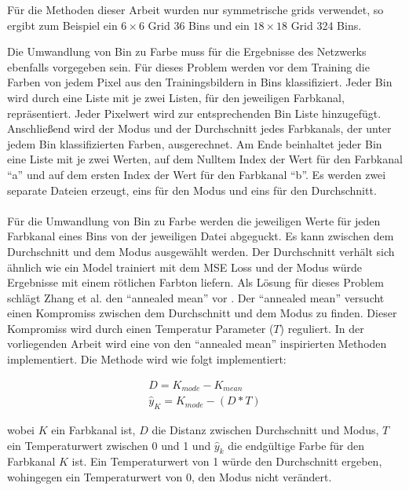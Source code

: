Für die Methoden dieser Arbeit wurden nur symmetrische \gls{grid}s verwendet, so ergibt zum Beispiel ein $6 \times 6$ Grid 36 Bins und 
ein $18 \times 18$ Grid 324 Bins.

Die Umwandlung von Bin zu Farbe muss für die Ergebnisse des Netzwerks ebenfalls vorgegeben sein. Für dieses Problem werden vor dem 
Training die Farben von jedem Pixel aus den Trainingsbildern in Bins klassifiziert. Jeder Bin wird durch eine Liste mit je zwei Listen, 
für den jeweiligen Farbkanal, repräsentiert. Jeder Pixelwert wird zur entsprechenden Bin Liste hinzugefügt. Anschließend wird der Modus 
und der Durchschnitt jedes Farbkanals, der unter jedem Bin klassifizierten Farben, ausgerechnet. Am Ende beinhaltet jeder Bin eine Liste mit je zwei
Werten, auf dem Nulltem Index der Wert für den Farbkanal ``a'' und auf dem ersten Index der Wert für den Farbkanal ``b''. Es werden zwei separate
Dateien erzeugt, eins für den Modus und eins für den Durchschnitt.
\\
\\
Für die Umwandlung von Bin zu Farbe werden die jeweiligen Werte für jeden Farbkanal eines Bins von der jeweiligen Datei abgeguckt. Es kann zwischen
dem Durchschnitt und dem Modus ausgewählt werden. Der Durchschnitt verhält sich ähnlich wie ein Model trainiert mit dem MSE Loss und der Modus
würde Ergebnisse mit einem rötlichen Farbton liefern. Als Lösung für dieses Problem schlägt Zhang et al. den ``annealed mean'' vor \cite{zhang2016colorful}.
Der ``annealed mean'' versucht einen Kompromiss zwischen dem Durchschnitt und dem Modus zu finden. Dieser Kompromiss wird durch einen 
Temperatur Parameter ($T$) reguliert. In der vorliegenden Arbeit wird eine von den ``annealed mean'' inspirierten Methoden implementiert. 
Die Methode wird wie folgt implementiert:

\begin{equation}
  \begin{gathered}
    D = K_{mode} - K_{mean} \\
    \hat{y}_{K} = K_{mode} - (D * T)
  \end{gathered}
\end{equation}

wobei $K$ ein Farbkanal ist, $D$ die Distanz zwischen Durchschnitt und Modus, $T$ ein Temperaturwert zwischen 0 und 1 und $\hat{y}_{k}$ die
endgültige Farbe für den Farbkanal $K$ ist.
Ein Temperaturwert von 1 würde den Durchschnitt ergeben, wohingegen ein Temperaturwert von 0, den Modus nicht verändert.

